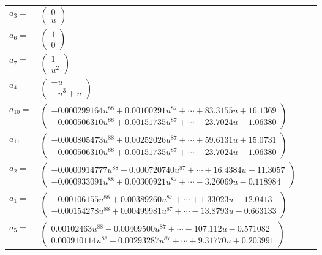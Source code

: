 \documentclass[1p]{elsarticle_modified}
\theoremstyle{definition}
\begin{document}
\begin{tabular}{m{7pt} m{180pt} m{7pt} m{180pt} }
\flushright $a_{3}=$&$\begin{pmatrix}0\\u\end{pmatrix}$ \\
\flushright $a_{6}=$&$\begin{pmatrix}1\\0\end{pmatrix}$ \\
\flushright $a_{7}=$&$\begin{pmatrix}1\\u^2\end{pmatrix}$ \\
\flushright $a_{4}=$&$\begin{pmatrix}- u\\- u^3+u\end{pmatrix}$ \\
\flushright $a_{10}=$&$\begin{pmatrix}-0.000299164 u^{88}+0.00100291 u^{87}+\cdots+83.3155 u+16.1369\\-0.000506310 u^{88}+0.00151735 u^{87}+\cdots-23.7024 u-1.06380\end{pmatrix}$ \\
\flushright $a_{11}=$&$\begin{pmatrix}-0.000805473 u^{88}+0.00252026 u^{87}+\cdots+59.6131 u+15.0731\\-0.000506310 u^{88}+0.00151735 u^{87}+\cdots-23.7024 u-1.06380\end{pmatrix}$ \\
\flushright $a_{2}=$&$\begin{pmatrix}-0.0000914777 u^{88}+0.000720740 u^{87}+\cdots+16.4384 u-11.3057\\-0.000933091 u^{88}+0.00300921 u^{87}+\cdots-3.26069 u-0.118984\end{pmatrix}$ \\
\flushright $a_{1}=$&$\begin{pmatrix}-0.00106155 u^{88}+0.00389260 u^{87}+\cdots+1.33023 u-12.0413\\-0.00154278 u^{88}+0.00499981 u^{87}+\cdots-13.8793 u-0.663133\end{pmatrix}$ \\
\flushright $a_{5}=$&$\begin{pmatrix}0.00102463 u^{88}-0.00409500 u^{87}+\cdots-107.112 u-0.571082\\0.000910114 u^{88}-0.00293287 u^{87}+\cdots+9.31770 u+0.203991\end{pmatrix}$ \\

\end{tabular}
\end{document}
